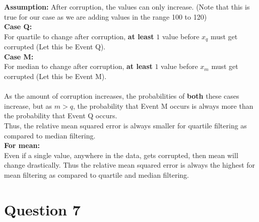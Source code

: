\documentclass[11pt]{article}
\begin{document}
\medskip
\textbf{Assumption:} After corruption, the values can only increase. (Note that this is true for our case as we are adding values in the range 100 to 120)\\
\textbf{Case Q:}\\
For quartile to change after corruption, \textbf{at least} $1$ value before $x_q$ must get corrupted (Let this be Event Q).\\
\textbf{Case M:}\\
For median to change after corruption, \textbf{at least} $1$ value before $x_m$ must get corrupted (Let this be Event M).\\
\\
As the amount of corruption increases, the probabilities of \textbf{both} these cases increase, but as $m > q$, the probability that Event M occurs is always more than the probability that Event Q occurs.\\
Thus, the relative mean squared error is always smaller for quartile filtering as compared to median filtering.\\

\medskip
\textbf{For mean:}\\
Even if a single value, anywhere in the data, gets corrupted, then mean will change drastically. Thus the relative mean squared error is always the highest for mean filtering as compared to quartile and median filtering.



\newpage
\section*{Question 7}
\end{document}
